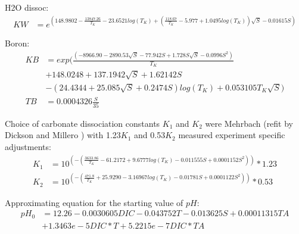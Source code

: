 \documentclass{ruthesis}
\begin{document}
H2O dissoc:
\begin{align*}
KW 		&= e^{(148.9802 - \frac{13847.26}{T_K}  - 23.6521 log(T_K) 
+ (\frac{118.67}{T_K} - 5.977 + 1.0495 log(T_K)) \sqrt{S} - 0.01615 S)} \nonumber 
\end{align*}

Boron:
\begin{align*}
KB 		&= exp(\frac{(-8966.90 - 2890.53 \sqrt{S} - 77.942 S + 1.728 S \sqrt{S} - 0.0996 S^2)}{T_K} \\
&+ 148.0248 + 137.1942 \sqrt{S} + 1.62142 S \\
&- (24.4344 + 25.085 \sqrt{S} + 0.2474 S) log(T_K) + 0.053105 T_K \sqrt{S}) \nonumber \\
TB 		&= 0.0004326 \frac{S}{35} \nonumber 
\end{align*}

Choice of carbonate dissociation constants $K_1$ and $K_2$ were Mehrbach \cite{mehrbach1973measurement} (refit by Dickson and Millero \cite{dickson1987comparison}) with 1.23$K_1$ and 0.53$K_2$ measured experiment specific adjustments:
\begin{align}
K_1 		&= 10^{(-(\frac{3633.86}{T_K} - 61.2172 + 9.6777 log(T_K) - 0.011555 S + 0.0001152 S^2))}*1.23 \\
K_2 		&= 10^{(-(\frac{471.8}{T_K} + 25.9290 - 3.16967 log(T_K) - 0.01781 S + 0.0001122 S^2))}*0.53 	
\end{align}


Approximating equation for the starting value of $pH$: 
\begin{align}
pH_{0} 	&= 12.26 -0.0030605 DIC -0.043752 T -0.013625 S+ 0.00011315 TA \nonumber \\
&+ 1.3463e-5 DIC*T + 5.2215e-7 DIC*TA  \label{pH_approx_eq}	
\end{align}
\end{document}
